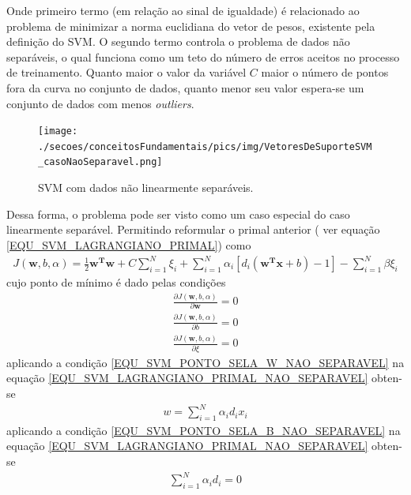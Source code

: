 Onde primeiro termo (em relação ao sinal de igualdade) é relacionado ao problema de minimizar a norma euclidiana do vetor de pesos, existente pela definição do SVM. O segundo termo controla o problema de dados não separáveis, o qual funciona como um teto do número de erros aceitos no processo de treinamento. Quanto maior o valor da variável \(C\) maior o número de pontos fora da curva no conjunto de dados, quanto menor seu valor espera-se um conjunto de dados com menos \emph{outliers}.
\begin{figure}[H]
  \centering
  \caption{SVM com dados não linearmente separáveis.}
  \texttt{[image: ./secoes/conceitosFundamentais/pics/img/VetoresDeSuporteSVM\_casoNaoSeparavel.png]}
  \label{FIGURA_SVM_Caso_Nao_Separavel}
\end{figure}
Dessa forma, o problema pode ser visto como um caso especial do caso linearmente separável. Permitindo reformular o primal anterior ( ver equação \eqref{EQU_SVM_LAGRANGIANO_PRIMAL}) como
\begin{align}
J(\mathbf{w}, b, \alpha) = \frac{1}{2}\mathbf{w^{T}}\mathbf{w} + C\sum\limits_{i=1}^{N}\xi_{i} + \sum\limits_{i=1}^{N} \alpha_{i}[d_{i}(\mathbf{w^{T}}\mathbf{x} + b) - 1] - \sum\limits_{i=1}^{N}\beta \xi_{i}  \label{EQU_SVM_LAGRANGIANO_PRIMAL_NAO_SEPARAVEL}
\end{align}
cujo ponto de mínimo é dado pelas condições
\begin{align}
 \frac{\partial J(\mathbf{w}, b, \alpha)}{\partial \mathbf{w}} = 0	\label{EQU_SVM_PONTO_SELA_W_NAO_SEPARAVEL}\\
 \frac{\partial J(\mathbf{w}, b, \alpha)}{\partial b} = 0  			\label{EQU_SVM_PONTO_SELA_B_NAO_SEPARAVEL}\\
 \frac{\partial J(\mathbf{w}, b, \alpha)}{\partial \xi} = 0  		\label{EQU_SVM_PONTO_SELA_xi_NAO_SEPARAVEL}
\end{align}
aplicando a condição \eqref{EQU_SVM_PONTO_SELA_W_NAO_SEPARAVEL} na equação \eqref{EQU_SVM_LAGRANGIANO_PRIMAL_NAO_SEPARAVEL} obten-se 
\begin{align}
w = \sum\limits_{i=1}^{N} \alpha_{i}d_{i}x_{i}  \label{EQU_SVM_PONTO_SELA_W_RESTRICAO_OBTIDA_NAO_SEPARAVEL}
\end{align}
aplicando a condição \eqref{EQU_SVM_PONTO_SELA_B_NAO_SEPARAVEL} na equação \eqref{EQU_SVM_LAGRANGIANO_PRIMAL_NAO_SEPARAVEL} obten-se 
\begin{align}
\sum\limits_{i=1}^{N} \alpha_{i}d_{i} = 0 \label{EQU_SVM_PONTO_SELA_B_RESTRICAO_OBTIDA_NAO_SEPARAVEL}
\end{align}

